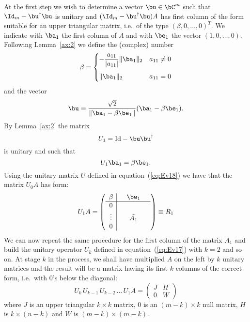 At the first step we wish to determine a vector $\bu \in \bC^m$ such
that $\Id_m - \bu^{\dagger} \bu$ is unitary and $(\Id_m -
\bu^{\dagger} \bu) A$ has first column of the form suitable for an
upper triangular matrix, i.e.\ of the type $(\beta, 0, \ldots, 0)^T$.
We indicate with $\ba_1$ the first column of $A$ and with $\be_1$ the
vector $(1,0,\ldots,0)$.  Following Lemma~\ref{ax:2} we define the
(complex) number
%
\begin{equation*}
  \beta =
  \begin{cases}
    -\dfrac{a_{11}}{|a_{11}|} \|\ba_1\|_2 & a_{11} \neq 0 \\*[4mm]
    \| \ba_1 \|_2 & a_{11} = 0
  \end{cases}
\end{equation*}
%
and the vector
%
\begin{equation*}
  \bu = \frac{\sqrt{2}}{\|\ba_1 - \beta \be_1\|} (\ba_1 - \beta \be_1) .
\end{equation*}
%
By Lemma~\ref{ax:2} the matrix
%
\begin{equation}
  U_1 = \text{Id} - \bu \bu^{\dagger}
  \label{eq:Ev18}
\end{equation}
%
is unitary and such that
%
\begin{equation}
  U_1 \ba_1 = \beta \be_1 .
  \label{eq:Ev19}
\end{equation}
%
Using the unitary matrix $U$ defined in equation~(\ref{eq:Ev18}) we
have that the matrix $U_0 A$ has form:
%
\begin{equation*}
  U_1 A =
  \left ( \begin{array}{c|ccc}
      \beta & & \bw_1 & \\ \hline
      0 & & & \\
      \vdots & & \tilde{A_1} & \\
      0 & & & \\
    \end{array} \right )  \equiv R_1
\end{equation*}
%
We can now repeat the same procedure for the first column of the
matrix $A_1$ and build the unitary operator $U_k$ defined in
equation~(\ref{eq:Ev17}) with $k=2$ and so on.  At stage $k$ in the
process, we shall have multiplied $A$ on the left by $k$ unitary
matrices and the result will be a matrix having its first $k$ columns
of the correct form, i.e.\ with $0$'s below the diagonal:
%
\begin{equation*}
  U_k \, U_{k-1} \, U_{k-2} \, \ldots \, U_1 A =
  \left ( \begin{array}{c|c} J & H \\ \hline 0 & W \end{array} \right )
\end{equation*}
%
where $J$ is an upper triangular $k \times k$ matrix, $0$ is an $(m-k)
\times k$ null matrix, $H$ is $k \times (n-k)$ and $W$ is $(m-k)
\times (m-k)$.

